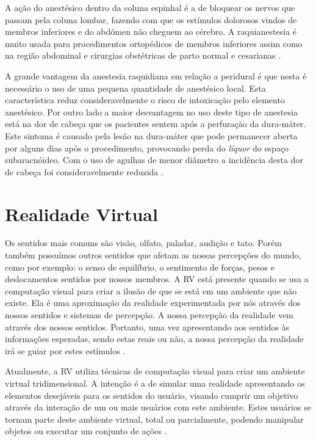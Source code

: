 A ação do anestésico dentro da coluna espinhal é a de bloquear os nervos que passam pela coluna lombar, fazendo com que os estímulos dolorosos vindos de membros inferiores e do abdômen não cheguem ao cérebro. A raquianestesia é muito usada para procedimentos ortopédicos de membros inferiores assim como na região abdominal e cirurgias obstétricas de parto normal e cesarianas \cite{Pinheiro2018}.

A grande vantagem da anestesia raquidiana em relação a peridural é que nesta é necessário o uso de uma pequena quantidade de anestésico local. Esta característica reduz consideravelmente o risco de intoxicação pelo elemento anestésico. Por outro lado a maior desvantagem no uso deste tipo de anestesia está na dor de cabeça que os pacientes sentem após a perfuração da dura-máter. Este sintoma é causado pela lesão na dura-máter que pode permanecer aberta por alguns dias após o procedimento, provocando perda do \textit{líquor} do espaço subaracnóideo. Com o uso de agulhas de menor diâmetro a incidência desta dor de cabeça foi consideravelmente reduzida \cite{INFOESCOLA2018}. 

\section{Realidade Virtual}

Os sentidos mais comuns são visão, olfato, paladar, audição e tato. Porém também possuímos outros sentidos que afetam as nossas percepções do mundo, como por exemplo: o senso de equilíbrio, o sentimento de forças, pesos e deslocamentos sentidos por nossos membros. A \acrfull{RV} está presente quando se usa a computação visual para criar a ilusão de que se está em um ambiente que não existe. Ela é uma aproximação da realidade experimentada por nós através dos nossos sentidos e sistemas de percepção. A nossa percepção da realidade vem através dos nossos sentidos. Portanto, uma vez apresentando aos sentidos às informações esperadas, sendo estas reais ou não, a nossa percepção da realidade irá se guiar por estes estímulos \cite{VRS2018}.

Atualmente, a \acrshort{RV} utiliza técnicas de computação visual para criar um ambiente virtual tridimensional. A intenção é a de simular uma realidade apresentando os elementos desejáveis para os sentidos do usuário, visando cumprir um objetivo através da interação de um ou mais usuários com este ambiente. Estes usuários se tornam parte deste ambiente virtual, total ou parcialmente, podendo manipular objetos ou executar um conjunto de ações \cite{VRS2018}.

